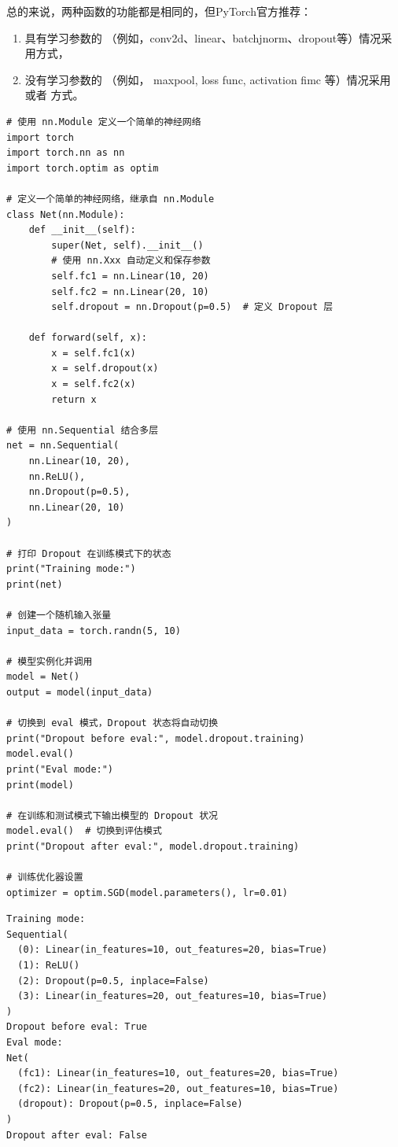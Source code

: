 总的来说，两种函数的功能都是相同的，但PyTorch官方推荐：
\begin{enumerate}[label=\arabic*)]
    \item 具有学习参数的
    （例如，conv2d、linear、batchjnorm、dropout等）情况采用方式，
    \item 没有学习参数的
    （例如， maxpool, loss func, activation fimc 等）情况采用  或者  方式。
\end{enumerate}

\begin{lstlisting}[style=pythonstyle]
# 使用 nn.Module 定义一个简单的神经网络    
import torch
import torch.nn as nn
import torch.optim as optim

# 定义一个简单的神经网络，继承自 nn.Module
class Net(nn.Module):
    def __init__(self):
        super(Net, self).__init__()
        # 使用 nn.Xxx 自动定义和保存参数
        self.fc1 = nn.Linear(10, 20)
        self.fc2 = nn.Linear(20, 10)
        self.dropout = nn.Dropout(p=0.5)  # 定义 Dropout 层

    def forward(self, x):
        x = self.fc1(x)
        x = self.dropout(x)
        x = self.fc2(x)
        return x

# 使用 nn.Sequential 结合多层
net = nn.Sequential(
    nn.Linear(10, 20),
    nn.ReLU(),
    nn.Dropout(p=0.5),
    nn.Linear(20, 10)
)

# 打印 Dropout 在训练模式下的状态
print("Training mode:")
print(net)

# 创建一个随机输入张量
input_data = torch.randn(5, 10)

# 模型实例化并调用
model = Net()
output = model(input_data)

# 切换到 eval 模式，Dropout 状态将自动切换
print("Dropout before eval:", model.dropout.training)
model.eval()
print("Eval mode:")
print(model)

# 在训练和测试模式下输出模型的 Dropout 状况
model.eval()  # 切换到评估模式
print("Dropout after eval:", model.dropout.training)

# 训练优化器设置
optimizer = optim.SGD(model.parameters(), lr=0.01)
\end{lstlisting}
\begin{lstlisting}[style=demostyle,numbers=none] 
Training mode:
Sequential(
  (0): Linear(in_features=10, out_features=20, bias=True)
  (1): ReLU()
  (2): Dropout(p=0.5, inplace=False)
  (3): Linear(in_features=20, out_features=10, bias=True)
)
Dropout before eval: True
Eval mode:
Net(
  (fc1): Linear(in_features=10, out_features=20, bias=True)
  (fc2): Linear(in_features=20, out_features=10, bias=True)
  (dropout): Dropout(p=0.5, inplace=False)
)
Dropout after eval: False    
\end{lstlisting}
